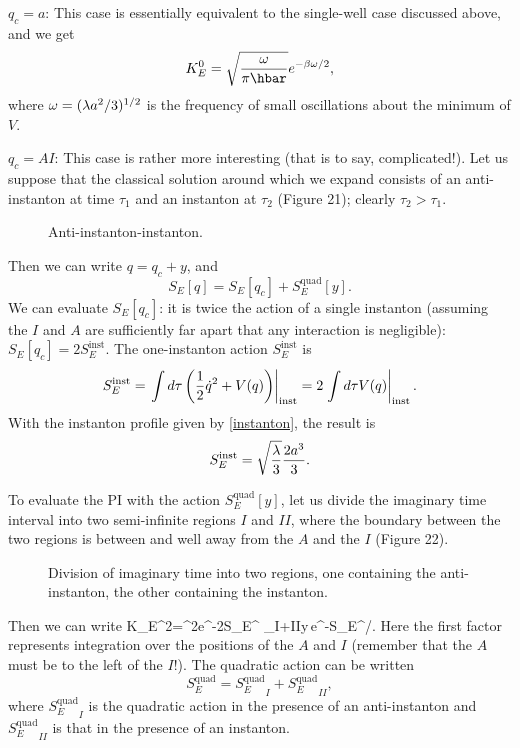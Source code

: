 \documentclass[12pt]{article}
\begin{document}
\noindent $q_c=a$: This case is essentially equivalent to the
single-well case discussed above, and we get
\[
K_E^0=\sqrt{\om\over\pi\hbar}e^{-\be\om/2},
\]
where ${\omega}=(\lambda a^2/3)^{1/2}$ is the frequency of small oscillations
about the minimum of $V$.

\noindent $q_c=AI$: This case is rather more interesting (that is to
say, complicated!). Let us suppose that the classical solution around
which we expand consists of an anti-instanton at time $\tau_1$ and an
instanton at $\tau_2$ (Figure 21); clearly $\tau_2>\tau_1$.

\begin{figure}[hb]
\epsfysize=5cm
\centerline{}
\caption{Anti-instanton-instanton.}
\end{figure}


Then we can write $q=q_c+y$, and
\[
S_E[q]=S_E[q_c]+S_E^{\mathrm{quad}}[y].
\]
We can evaluate $S_E[q_c]$: it is twice the action of a single
instanton (assuming the $I$ and $A$ are sufficiently far apart that any
interaction is negligible): $S_E[q_c]=2S_E^{\mathrm{inst}}$. The
one-instanton action $S_E^{\mathrm{inst}}$ is
\[
S_E^{\mathrm{inst}}
=\left.\int d\tau\left({\frac 12}{\dot q}^2+V(q)\right)
\right|_{\mathrm{inst}}=2\left.
\int d\tau V(q)\right|_{\mathrm{inst}}.
\]
With the instanton profile given by \eqref{instanton}, the result is
\[
S_E^{\mathrm{inst}}=\sqrt{\lambda\over3}{2a^3\over3}.
\]

To evaluate the PI with the action $S_E^{\mathrm{quad}}[y]$, let us
divide the imaginary time interval into two semi-infinite regions $I$
and $II$, where the boundary between the two regions is between and well
away from the $A$ and the $I$ (Figure 22).
\begin{figure}[hb]
\epsfysize=5cm
\centerline{}
\caption{Division of imaginary time into two regions, one containing
  the anti-instanton, the other containing the instanton.}
\end{figure}


Then we can write
\beq
K_E^2={\be^2}e^{-2S_E^{}}
\int_{I+II}\DD y\,e^{-S_E^{}/\hbar}.
\label{inst6}
\eeq
Here the first factor represents integration over the positions of the
$A$ and $I$ (remember that the $A$ must be to the left of the $I$!).
The quadratic action can be written
\[
S_E^{\mathrm{quad}}={S_E^{\mathrm{quad}}}_{I}+{S_E^{\mathrm{quad}}}_{II},
\]
where ${S_E^{\mathrm{quad}}}_{I}$ is the quadratic action in the presence
of an anti-instanton
and ${S_E^{\mathrm{quad}}}_{II}$ is that in the presence of an
instanton. 
\end{document}
